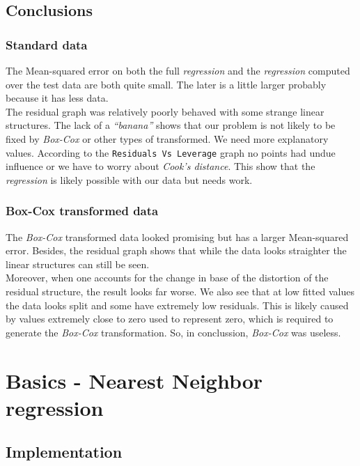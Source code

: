 \documentclass[12pt,a4paper]{article}
\begin{document}
\begin{singlespace}
\subsection{Conclusions}
\subsubsection{Standard data}
The Mean-squared error on both the full \emph{regression} and the \emph{regression} computed over the test data are both quite small. The later is a little larger probably because it has less data. \\

The residual graph was relatively poorly behaved with some strange linear structures.
The lack of a \emph{``banana''} shows that our problem is not likely to be fixed by \emph{Box-Cox} or other types of transformed. We need more explanatory values.
According to the \texttt{Residuals Vs Leverage} graph no points had undue influence
or we have to worry about \emph{Cook's distance}. This show that the \emph{regression} is likely possible with our data but needs work.


\subsubsection{Box-Cox transformed data}
The \emph{Box-Cox} transformed data looked promising but has a larger Mean-squared error. Besides, the residual graph shows that while the data looks straighter the linear structures can still be seen. \\

Moreover, when one accounts for the change in base of the distortion of the residual structure, the result looks far worse. We also see that at low fitted values the data looks split and some have extremely low residuals. This is likely caused by values extremely close to zero used to represent zero, which is required to generate the \emph{Box-Cox} transformation. So, in conclussion, \emph{Box-Cox} was useless. 

\section{Basics - Nearest Neighbor regression}
\subsection{Implementation}



\end{singlespace}
\end{document}

